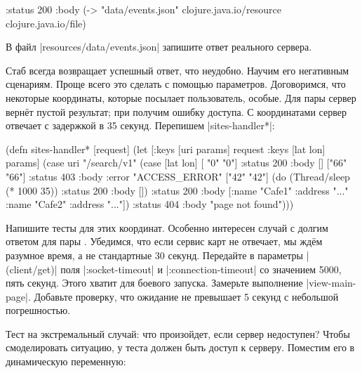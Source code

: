 
\begin{english}
  \begin{clojure}
{:status 200
 :body (-> "data/events.json"
           clojure.java.io/resource
           clojure.java.io/file)}
  \end{clojure}
\end{english}

\noindent
В файл \spverb|resources/data/events.json| запишите ответ реального сервера.


Стаб всегда возвращает успешный ответ, что неудобно. Научим его негативным
сценариям. Проще всего это сделать с помощью параметров. Договоримся, что
некоторые координаты, которые посылает пользователь, особые. Для пары
 сервер вернёт пустой результат; при  получим ошибку
доступа. С координатами  сервер отвечает с задержкой в 35
секунд. Перепишем \spverb|sites-handler*|:

\begin{english}
  \begin{clojure}
(defn sites-handler* [request]
  (let [{:keys [uri params]} request
        {:keys [lat lon]} params]
    (case uri
      "/search/v1"
      (case [lat lon]
        [ "0"  "0"] {:status 200 :body []}
        ["66" "66"] {:status 403 :body {:error "ACCESS_ERROR"}}
        ["42" "42"] (do (Thread/sleep (* 1000 35))
                        {:status 200 :body []})
        {:status 200
         :body [{:name "Cafe1" :address "..."}
                {:name "Cafe2" :address "..."}]})
      {:status 404 :body "page not found"})))
  \end{clojure}
\end{english}


Напишите тесты для этих координат. Особенно интересен случай с долгим ответом
для пары . Убедимся, что если сервис карт не отвечает, мы ждём
разумное время, а не стандартные 30 секунд. Передайте в параметры
\spverb|(client/get)| поля \spverb|:socket-timeout| и
\spverb|:connection-timeout| со значением 5000, пять секунд. Этого хватит для
боевого запуска. Замерьте выполнение \spverb|view-main-page|. Добавьте проверку,
что ожидание не превышает 5 секунд с небольшой погрешностью.

Тест на экстремальный случай: что произойдет, если сервер недоступен? Чтобы
смоделировать ситуацию, у теста должен быть доступ к серверу. Поместим его в
динамическую переменную:

